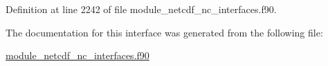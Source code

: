 Definition at line 2242 of file module\+\_\+netcdf\+\_\+nc\+\_\+interfaces.\+f90.



The documentation for this interface was generated from the following file\+:\begin{DoxyCompactItemize}
\item 
\hyperlink{module__netcdf__nc__interfaces_8f90}{module\+\_\+netcdf\+\_\+nc\+\_\+interfaces.\+f90}\end{DoxyCompactItemize}
